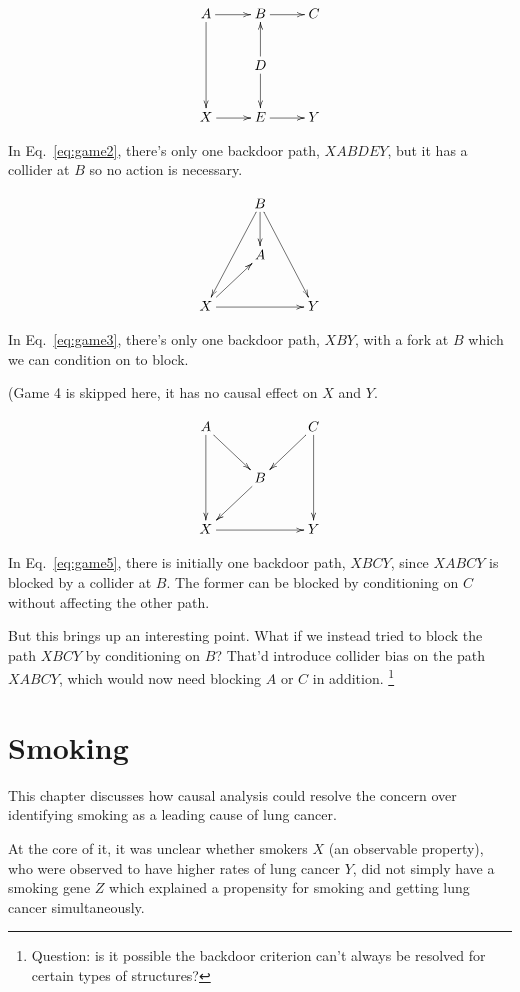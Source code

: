 \documentclass{article}
\begin{document}
\begin{align} \label{eq:game2}
  \xymatrix{
  A\ar[dd]\ar[r] & B\ar[r] & C \\
  &D\ar[u]\ar[d]&\\
  X\ar[r]& E\ar[r] &Y
}
\end{align}

In Eq.~\ref{eq:game2}, there's only one backdoor path, $XABDEY$, but it has a collider at $B$ so no action is necessary.


\begin{align} \label{eq:game3}
  \xymatrix{
  & \ar[ddl]\ar[ddr]B\ar[d] &  \\
  &A&\\
  X\ar[ru]\ar[rr]&  &Y
}
\end{align}

In Eq.~\ref{eq:game3}, there's only one backdoor path, $XBY$, with a fork at $B$ which we can condition on to block.

(Game 4 is skipped here, it has no causal effect on $X$ and $Y$.

\begin{align} \label{eq:game5}
  \xymatrix{
  A\ar[dd] \ar[dr] & &C\ar[ld]\ar[dd]\\
                   & B\ar[dl] &\\
  X \ar[rr]& & Y
}
\end{align}

In Eq.~\ref{eq:game5}, there is initially one backdoor path, $XBCY$, since $XABCY$ is blocked by a collider at $B$. The former can be blocked by conditioning on $C$ without affecting the other path.

But this brings up an interesting point. What if we instead tried to block the path $XBCY$ by conditioning on $B$? That'd introduce collider bias on the path $XABCY$, which would now need blocking $A$ or $C$ in addition. \footnote{Question: is it possible the backdoor criterion can't always be resolved for certain types of structures?}

\section{Smoking}

This chapter discusses how causal analysis could resolve the concern over identifying smoking as a leading cause of lung cancer.

At the core of it, it was unclear whether smokers $X$ (an observable property), who were observed to have higher rates of lung cancer $Y$, did not simply have a smoking gene $Z$ which explained a propensity for smoking and getting lung cancer simultaneously.
\end{document}
